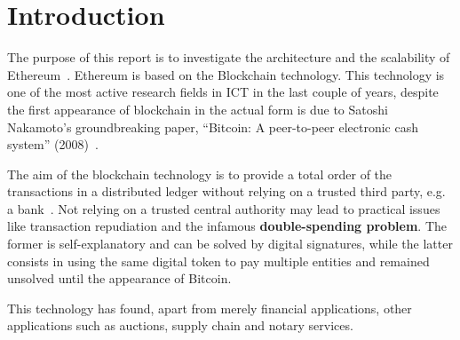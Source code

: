 \section*{Introduction}

The purpose of this report is to investigate the architecture and the 
scalability of Ethereum~\cite{wood2018ethereum}. Ethereum is based on the 
Blockchain technology. This technology is one of the most active research
fields in ICT in the last couple of years, despite the first appearance of
blockchain in the actual form is due to Satoshi Nakamoto's groundbreaking 
paper, ``Bitcoin: A peer-to-peer electronic cash system''
(2008)~\cite{bib:bitcoin}. 

The aim of the blockchain technology is to provide a total order of the 
transactions in a distributed ledger without relying on a trusted third party, 
e.g. a bank~\cite{bib:the-quest}. Not relying on a trusted central authority
may lead to practical issues like transaction repudiation and the infamous 
\textbf{double-spending problem}. The former is self-explanatory and can
be solved by digital signatures, while the latter consists in using the same
digital token to pay multiple entities and remained unsolved until the 
appearance of Bitcoin.

This technology has found, apart from merely financial applications, other
applications such as auctions, supply chain and notary services.

